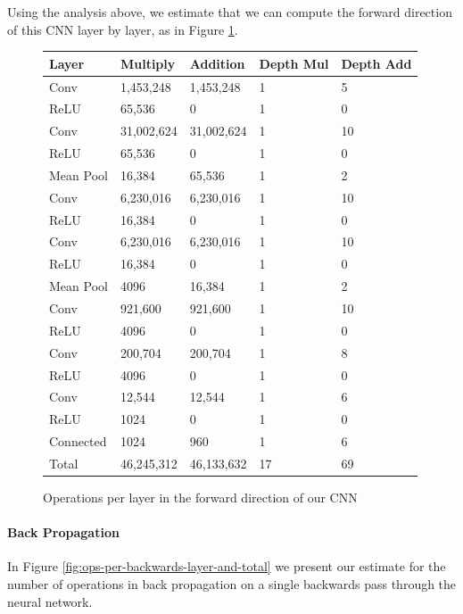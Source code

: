 Using the analysis above, we estimate that we can compute the forward direction of this CNN layer by layer, as in Figure \ref{fig:ops-per-layer-and-total}. \\
\begin{figure}[h!]
\begin{tabular}{ m{7em} | m{7em} m{7em} m{5em} m{5em} }
Layer & Multiply & Addition & Depth Mul & Depth Add \\ \hline
Conv & 1,453,248 &	1,453,248 & 1 &	5 \\
ReLU & 65,536	 & 0&	1&	0 \\
Conv & 31,002,624 &	31,002,624&	1&	10 \\
ReLU & 65,536	& 0& 	1	& 0 \\
Mean Pool & 16,384	& 65,536	& 1& 	2\\
Conv & 6,230,016 & 	6,230,016 & 	1	& 10 \\
ReLU & 16,384	& 0	& 1 &	0 \\
Conv & 6,230,016 &	6,230,016	&1	&10 \\
ReLU & 16,384 & 	0 &	1	& 0 \\
Mean Pool & 4096 &	16,384 & 	1& 	2\\
Conv & 921,600 & 	921,600 &	1 &	10 \\
ReLU & 4096 &	0	&1 &	0 \\
Conv & 200,704 &	200,704	&1	& 8\\
ReLU & 4096 &	0 &	1&  	0\\
Conv & 12,544	& 12,544 &	1	& 6\\
ReLU & 1024	& 0	& 1 &	0\\
Connected & 1024 &	960	& 1 &	6 \\ \hline
Total & 46,245,312 &	46,133,632 &	17&	69
\end{tabular}
\caption{Operations per layer in the forward direction of our CNN}
\label{fig:ops-per-layer-and-total}
\end{figure}

\paragraph{Back Propagation}

In Figure \ref{fig:ops-per-backwards-layer-and-total} we present our estimate for the number of operations in back propagation on a single backwards pass through the neural network.

